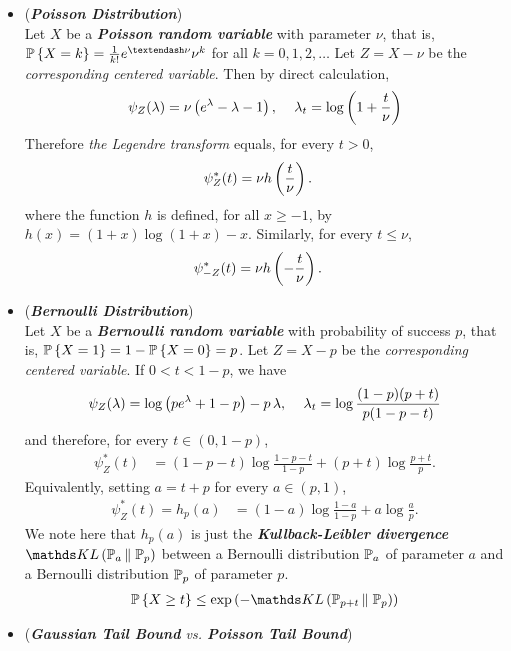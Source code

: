 \documentclass[11pt]{article}
\begin{document}
\begin{itemize}
\item \begin{example} (\emph{\textbf{Poisson Distribution}})\\
Let $X$ be a \emph{\textbf{Poisson random variable}} with parameter $\nu$, that is, $\bP\set{X = k} = \frac{1}{k!}e^{–\nu}\nu^k$ for all $k = 0, 1, 2, \ldots$ Let $Z = X - \nu$ be the \emph{corresponding centered variable}. Then by direct calculation,
\begin{align*}
\psi_Z(\lambda) = \nu\left(e^{\lambda} - \lambda - 1 \right),\, \quad \lambda_t = \log\left(1 + \frac{t}{\nu}\right)
\end{align*} Therefore \emph{the Legendre transform} equals, for every $t > 0$,
\begin{align*}
\psi_{Z}^{*}(t) &= \nu h\left(\frac{t}{\nu}\right).
\end{align*} where the function $h$ is defined, for all  $x \ge -1$, by $h(x) = (1 + x) \log(1 + x) - x$. Similarly,
for every $t \le \nu$,
\begin{align*}
\psi_{-Z}^{*}(t) &= \nu h\left(-\frac{t}{\nu}\right).
\end{align*} 
\end{example}


\item \begin{example} (\emph{\textbf{Bernoulli Distribution}})\\
Let $X$ be  a \emph{\textbf{Bernoulli random variable}} with probability of success $p$, that is, ${\mathbb P}\left\{X = 1\right\} = 1- {\mathbb P}\left\{X =0\right\} = p$. Let $Z = X -  p$ be the \emph{corresponding centered variable}. If $0 < t < 1 - p$, we have
\begin{align*}
\psi_Z(\lambda) = \log\left(p e^{\lambda} + 1 - p \right) - p \,\lambda ,\, \quad \lambda_t = \log \frac{(1-p)(p + t)}{p(1 - p - t)}
\end{align*} and therefore, for every $t \in (0, 1 - p)$,
\begin{align*}
\psi_{Z}^{*}(t) &= (1-p-t)\log\frac{1 - p - t}{1 - p} + (p + t)\log \frac{p + t}{p}.
\end{align*} Equivalently, setting $a = t + p$ for every $a \in (p, 1)$,
\begin{align*}
\psi_{Z}^{*}(t) = h_p(a)&= (1- a)\log\frac{1- a}{1 - p} + a \log\frac{a}{p}.
\end{align*}  We note here that $h_p(a)$ is just the \emph{\textbf{Kullback-Leibler divergence}} $\kl{\bP_a}{\bP_p}$ between a Bernoulli distribution ${\mathbb P}_a$ of parameter $a$ and a Bernoulli distribution ${\mathbb P}_p$ of parameter $p$. 
\begin{align*}
\bP\set{X \ge t} \le \exp\paren{- \kl{\bP_{p+t}}{\bP_p}}
\end{align*}
\end{example}

\item \begin{remark} (\emph{\textbf{Gaussian Tail Bound} vs. \textbf{Poisson Tail Bound}})\\
\end{remark}
\end{itemize}
\end{document}
